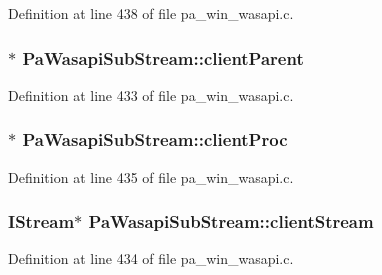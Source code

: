 Definition at line 438 of file pa\+\_\+win\+\_\+wasapi.\+c.

\subsubsection[{\texorpdfstring{client\+Parent}{clientParent}}]{$\ast$ Pa\+Wasapi\+Sub\+Stream\+::client\+Parent}\hypertarget{struct_pa_wasapi_sub_stream_ad21bfcde276613bdfd3d7950b9ea7755}{}\label{struct_pa_wasapi_sub_stream_ad21bfcde276613bdfd3d7950b9ea7755}


Definition at line 433 of file pa\+\_\+win\+\_\+wasapi.\+c.

\subsubsection[{\texorpdfstring{client\+Proc}{clientProc}}]{$\ast$ Pa\+Wasapi\+Sub\+Stream\+::client\+Proc}\hypertarget{struct_pa_wasapi_sub_stream_a0a866d34fa348461a94eee93dbc7769e}{}\label{struct_pa_wasapi_sub_stream_a0a866d34fa348461a94eee93dbc7769e}


Definition at line 435 of file pa\+\_\+win\+\_\+wasapi.\+c.

\subsubsection[{\texorpdfstring{client\+Stream}{clientStream}}]{\setlength{\rightskip}{0pt plus 5cm}I\+Stream$\ast$ Pa\+Wasapi\+Sub\+Stream\+::client\+Stream}\hypertarget{struct_pa_wasapi_sub_stream_a218a9cb87b0ea5fcc68a1c04058d1923}{}\label{struct_pa_wasapi_sub_stream_a218a9cb87b0ea5fcc68a1c04058d1923}


Definition at line 434 of file pa\+\_\+win\+\_\+wasapi.\+c.

